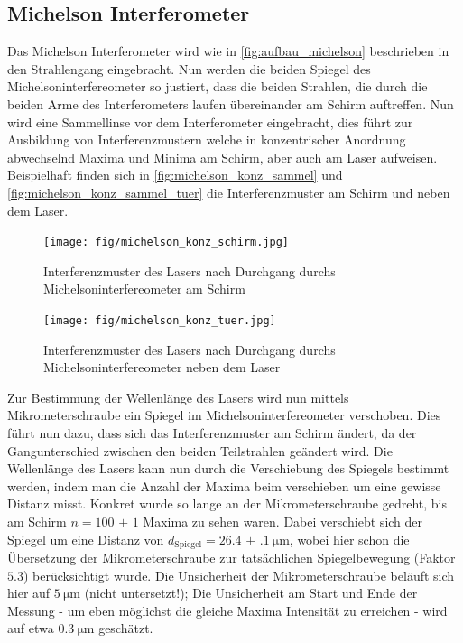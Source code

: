 \documentclass[ngerman]{scrartcl}
\begin{document}
\subsection{Michelson Interferometer}
\label{sec:durchfuehrung_michelson}
Das Michelson Interferometer wird wie in \autoref{fig:aufbau_michelson} beschrieben in den Strahlengang eingebracht. Nun werden die beiden Spiegel des Michelsoninterfereometer so justiert, dass die beiden Strahlen, die durch die beiden Arme des Interferometers laufen übereinander am Schirm auftreffen. Nun wird eine Sammellinse vor dem Interferometer eingebracht, dies führt zur Ausbildung von Interferenzmustern welche in konzentrischer Anordnung abwechselnd Maxima und Minima am Schirm, aber auch am Laser aufweisen. Beispielhaft finden sich in \autoref{fig:michelson_konz_sammel} und \autoref{fig:michelson_konz_sammel_tuer} die Interferenzmuster am Schirm und neben dem Laser.

\begin{figure}[H]
    \centering
    \begin{samepage}
        \texttt{[image: fig/michelson\_konz\_schirm.jpg]}
        \caption{Interferenzmuster des Lasers nach Durchgang durchs Michelsoninterfereometer am Schirm}
        \label{fig:michelson_konz_sammel}
    \end{samepage}
\end{figure}
\begin{figure}[H]
    \centering
    \begin{samepage}
        \texttt{[image: fig/michelson\_konz\_tuer.jpg]}
        \caption{Interferenzmuster des Lasers nach Durchgang durchs Michelsoninterfereometer neben dem Laser}
        \label{fig:michelson_konz_sammel_tuer}
    \end{samepage}
\end{figure}
Zur Bestimmung der Wellenlänge des Lasers wird nun mittels Mikrometerschraube ein Spiegel im Michelsoninterfereometer verschoben. Dies führt nun dazu, dass sich das Interferenzmuster am Schirm ändert, da der Gangunterschied zwischen den beiden Teilstrahlen geändert wird. Die Wellenlänge des Lasers kann nun durch die Verschiebung des Spiegels bestimmt werden, indem man die Anzahl der Maxima beim verschieben um eine gewisse Distanz misst. Konkret wurde so lange an der Mikrometerschraube gedreht, bis am Schirm $n = \num{100(1)}$ Maxima zu sehen waren. Dabei verschiebt sich der Spiegel um eine Distanz von $d_\text{Spiegel} = \SI{26.4(1)}{\micro\meter}$, wobei hier schon die Übersetzung der Mikrometerschraube zur tatsächlichen Spiegelbewegung (Faktor $5.3$) berücksichtigt wurde. Die Unsicherheit der Mikrometerschraube beläuft sich hier auf $\SI{5}{\micro\meter}$ (nicht untersetzt!); Die Unsicherheit am Start und Ende der Messung - um eben möglichst die gleiche Maxima Intensität zu erreichen - wird auf etwa $\SI{0.3}{\micro\meter}$ geschätzt.
\end{document}
